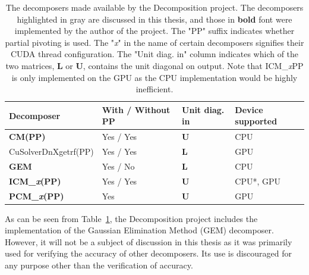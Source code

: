 \begin{table}[ht!]
	\centering
	\begin{tabular}{|l|l|l|l|}
		\hline
		\rowcolor[HTML]{C0C0C0} \textbf{Decomposer}          & \textbf{With / Without PP} & \textbf{Unit diag. in} & \textbf{Device supported} \\ \hline
		\cellcolor[HTML]{EFEFEF}\textbf{CM(PP)}              & Yes / Yes                  & $\mathbf{U}$           & CPU                       \\
		\cellcolor[HTML]{EFEFEF}CuSolverDnXgetrf(PP)         & Yes / Yes                  & $\mathbf{L}$           & GPU                       \\
		\textbf{GEM}                                         & Yes / No                   & $\mathbf{L}$           & CPU                       \\
		\cellcolor[HTML]{EFEFEF}\textbf{ICM\_\textit{x}(PP)} & Yes / Yes                  & $\mathbf{U}$           & CPU*, GPU                 \\
		\cellcolor[HTML]{EFEFEF}\textbf{PCM\_\textit{x}(PP)} & Yes                        & $\mathbf{U}$           & GPU                       \\ \hline
	\end{tabular}
	\caption{The decomposers made available by the Decomposition project.
		The decomposers highlighted in gray are discussed in this thesis, and those in \textbf{bold} font were implemented by the author of the project.
		The "PP" suffix indicates whether partial pivoting is used.
		The "\textit{x}" in the name of certain decomposers signifies their CUDA thread configuration.
		The "Unit diag.	in" column indicates which of the two matrices, $\mathbf{L}$ or $\mathbf{U}$, contains the unit diagonal on output.
		Note that ICM\_\textit{x}PP is only implemented on the GPU as the CPU implementation would be highly inefficient.
	}
	\label{Table:implementation->decomposition-project->implemented-solutions->decomposers->decomposers-in-the-project}
\end{table}

As can be seen from Table~\ref{Table:implementation->decomposition-project->implemented-solutions->decomposers->decomposers-in-the-project}, the Decomposition project includes the implementation of the Gaussian Elimination Method (GEM) decomposer.
However, it will not be a subject of discussion in this thesis as it was primarily used for verifying the accuracy of other decomposers.
Its use is discouraged for any purpose other than the verification of accuracy.


